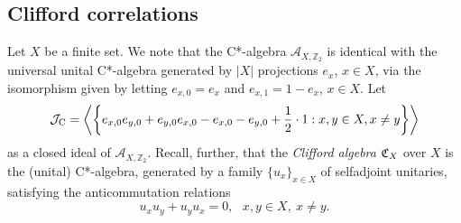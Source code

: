 \documentclass[11pt]{amsart}
\theoremstyle{definition}
\newcommand{\cl}[1]{\mathcal{#1}}
\newcommand{\bb}[1]{\mathbb{#1}}
\begin{document}
        






\subsection{Clifford correlations}\label{ss_clifford}

Let $X$ be a finite set. 
We note that the C*-algebra $\cl A_{X,\bb{Z}_2}$ is identical with the 
universal unital C*-algebra generated by $|X|$ projections $e_x$, $x\in X$, via the
isomorphism given by letting 
$e_{x,0} = e_x$ and $e_{x,1} = 1 - e_x$, $x\in X$. 
Let 
$$\cl J_{\rm C} = \left\langle \left\{e_{x,0} e_{y,0} + e_{y,0} e_{x,0}  - 
e_{x,0} - e_{y,0} + \frac{1}{2}\cdot 1 
: x,y\in X, x\neq y \right\}\right\rangle$$
as a closed ideal of $\cl A_{X,\bb{Z}_2}$.
Recall, further, that the \emph{Clifford algebra} $\frak{C}_X$ over $X$ 
is the (unital) C*-algebra, generated by a family 
$\{u_x\}_{x\in X}$ of selfadjoint unitaries, satisfying the anticommutation relations 
$$u_x u_y + u_y u_x = 0, \ \ \ x,y\in X, \ x\neq y.$$
\end{document}
